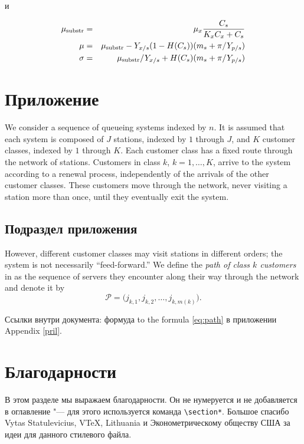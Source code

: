 \documentclass[final,pdftex]{epsilonj}
\numberwithin{equation}{section}
\begin{document}
и

\begin{eqnarray}
 \mu_{\rm substr} & = & \mu_{x} \frac{C_{s}}{K_{x}C_{x}+C_{s}}  \\
 \mu              & = & \mu_{\rm substr} - Y_{x/s}(1-H(C_{s}))(m_{s}+\pi /Y_{p/s}) \\
 \sigma           & = & \mu_{\rm substr}/Y_{x/s}+ H(C_{s}) (m_{s}+ \pi /Y_{p/s})
\end{eqnarray}

\printbibliography

\appendix

\section{Приложение}


We consider a sequence of queueing systems
indexed by $n$.  It is assumed that each system
is composed of $J$ stations, indexed by $1$
through $J$, and $K$ customer classes, indexed
by $1$ through $K$.  Each customer class
has a fixed route through the network of
stations.  Customers in class
$k$, $k=1,\ldots,K$, arrive to the
system according to a
renewal process, independently of the arrivals
of the other customer classes.  These customers
move through the network, never visiting a station
more than once, until they eventually exit
the system.


\subsection{Подраздел приложения}

However, different customer classes may visit
stations in different orders; the system
is not necessarily ``feed-forward.''
We define the {\em path of class $k$ customers} in
as the sequence of servers
they encounter along their way through the network
and denote it by
\begin{equation}
\mathcal{P}=\bigl(j_{k,1},j_{k,2},\dots,j_{k,m(k)}\bigr). \label{eq:path}
\end{equation}

Ссылки внутри документа: формуда to the formula \ref{eq:path} в приложении Appendix \ref{pril}.

\section*{Благодарности}
В этом разделе мы выражаем благодарности. Он не нумеруется и не добавляется в оглавление "--- для этого используется команда \verb"\section*". Большое спасибо Vytas Statulevicius, VTeX, Lithuania и Эконометрическому обществу США за идеи для данного стилевого файла.
\end{document}
